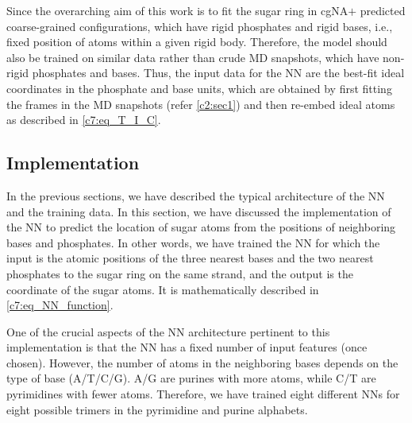 Since the overarching aim of this work is to fit the sugar ring in cgNA$+$ predicted coarse-grained configurations, which have rigid phosphates and rigid bases, i.e., fixed position of atoms within a given rigid body.
Therefore, the model should also be trained on similar data rather than crude MD snapshots, which have non-rigid phosphates and bases.
Thus, the input data for the NN are the best-fit ideal coordinates in the phosphate and base units, which are obtained by first fitting the frames in the MD snapshots (refer \cref{c2:sec1}) and then re-embed ideal atoms as described in \cref{c7:eq_T_I_C}. 

\subsection{Implementation}
In the previous sections, we have described the typical architecture of the NN and the training data.
In this section, we have discussed the implementation of the NN to predict the location of sugar atoms from the positions of neighboring bases and phosphates.
In other words, we have trained the NN for which the input is the atomic positions of the three nearest bases and the two nearest phosphates to the sugar ring on the same strand, and the output is the coordinate of the sugar atoms.  It is mathematically described in \cref{c7:eq_NN_function}.

One of the crucial aspects of the NN architecture pertinent to this implementation is that the NN has a fixed number of input features (once chosen).
However, the number of atoms in the neighboring bases depends on the type of base (A/T/C/G). 
A/G are purines with more atoms, while C/T are pyrimidines with fewer atoms.
Therefore, we have trained eight different NNs for eight possible trimers in the pyrimidine and purine alphabets.

